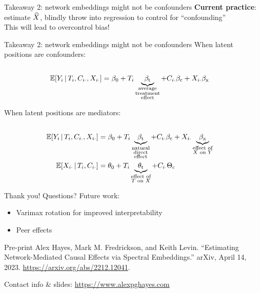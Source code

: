\documentclass[aspectratio=169]{beamer}
\theoremstyle{remark}
\begin{document}
\begin{frame}{Takeaway 2: network embeddings might not be confounders}
    \centering
    \textbf{Current practice}: estimate $\widehat{X}$, blindly throw into regression to control for ``confounding'' \\
    \vspace{4mm}
    This will lead to overcontrol bias!
\end{frame}

\begin{frame}{Takeaway 2: network embeddings might not be confounders}
    When latent positions are confounders:
    \begin{equation*}
        \begin{aligned}                                                    \\
            \E[T_i, \C_{i \cdot}, \X_{i \cdot}]{Y_i}
             & = \betazero + T_i \underbrace{\betat}_{\substack{\text{average} \\ \text{treatment} \\ \text{effect}}} + \C_{i \cdot} \betac + \X_{i \cdot} \betax
        \end{aligned}
    \end{equation*}

    When latent positions are mediators:
    \begin{equation*}
        \begin{aligned}                                                    \\
            \E[T_i, \C_{i \cdot}, \X_{i \cdot}]{Y_i}
             & = \betazero + T_i \underbrace{\betat}_{\substack{\text{natural}     \\ \text{direct} \\ \text{effect}}} + \C_{i \cdot} \betac + \X_{i \cdot} \underbrace{\betax}_{\substack{\text{effect of} \\ \text{$X$ on $Y$}}}  \\
            \E[T_i, \C_{i \cdot}]{\X_{i \cdot}}
             & = \thetazero + T_i \underbrace{\thetat}_{\substack{\text{effect of} \\ \text{$T$ on $X$}}}  + \C_{i \cdot} \Thetac
        \end{aligned}
    \end{equation*}
\end{frame}

\begin{frame}{Thank you! Questions?}
    Future work:
    \begin{itemize}
        \item Varimax rotation for improved interpretability
        \item Peer effects
    \end{itemize}
    \vspace{4mm}
    \begin{block}{Pre-print}
        Alex Hayes, Mark M. Fredrickson, and Keith Levin. “Estimating Network-Mediated Causal Effects via Spectral Embeddings.” arXiv, April 14, 2023. \url{https://arxiv.org/abs/2212.12041}.
    \end{block}
    \centering
    Contact info \& slides: \href{www.alexpghayes.com}{https://www.alexpghayes.com}
\end{frame}
\end{document}
